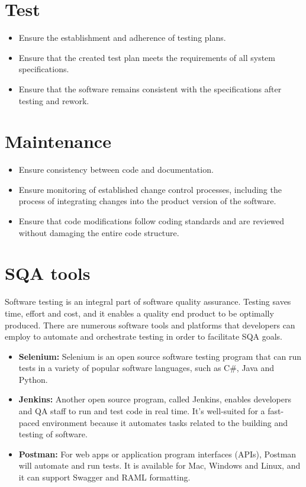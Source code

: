 \documentclass{article}
\begin{document}
\section{Test}
\begin{itemize}
\item Ensure the establishment and adherence of testing plans.
\item Ensure that the created test plan meets the requirements of all system specifications.
\item Ensure that the software remains consistent with the specifications after testing and rework.
\end{itemize}
\section{Maintenance}
\begin{itemize}
\item Ensure consistency between code and documentation.
\item Ensure monitoring of established change control processes, including the process of integrating changes into the product version of the software.
\item Ensure that code modifications follow coding standards and are reviewed without damaging the entire code structure.
\end{itemize}
\newpage
\section{SQA tools}
Software testing is an integral part of software quality assurance. Testing saves time, effort and cost, and it enables a quality end product to be optimally produced. There are numerous software tools and platforms that developers can employ to automate and orchestrate testing in order to facilitate SQA goals.\\
\begin{itemize}
\item \textbf{Selenium:} Selenium is an open source software testing program that can run tests in a variety of popular software languages, such as C\#, Java and Python.
\item \textbf{Jenkins:} Another open source program, called Jenkins, enables developers and QA staff to run and test code in real time. It's well-suited for a fast-paced environment because it automates tasks related to the building and testing of software.
\item \textbf{Postman:} For web apps or application program interfaces (APIs), Postman will automate and run tests. It is available for Mac, Windows and Linux, and it can support Swagger and RAML formatting.
\end{itemize}
\end{document}
